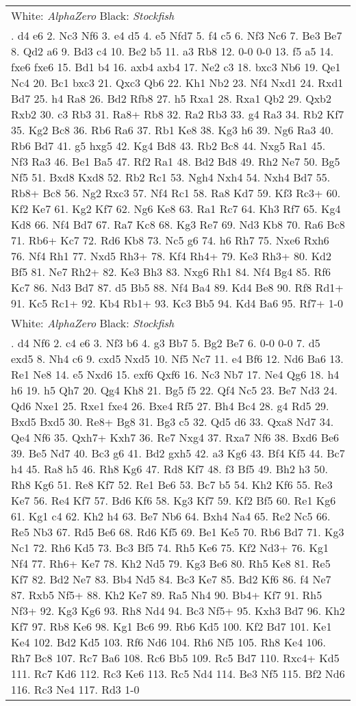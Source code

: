 \documentclass[12pt]{article}
\begin{document}
\begin{small}
\begin{longtable}{p{\textwidth}}
\hline
White: \emph{AlphaZero} Black: \emph{Stockfish} \\\nopagebreak
1. d4 e6 2. Nc3 Nf6 3. e4 d5 4. e5 Nfd7 5. f4 c5 6. Nf3 Nc6 7. Be3 Be7 8. Qd2 a6 9. Bd3 c4 10. Be2 b5 11. a3 Rb8 12. 0-0 0-0 13. f5 a5 14. fxe6 fxe6 15. Bd1 b4 16. axb4 axb4 17. Ne2 c3 18. bxc3 Nb6 19. Qe1 Nc4 20. Bc1 bxc3 21. Qxc3 Qb6 22. Kh1 Nb2 23. Nf4 Nxd1 24. Rxd1 Bd7 25. h4 Ra8 26. Bd2 Rfb8 27. h5 Rxa1 28. Rxa1 Qb2 29. Qxb2 Rxb2 30. c3 Rb3 31. Ra8+ Rb8 32. Ra2 Rb3 33. g4 Ra3 34. Rb2 Kf7 35. Kg2 Bc8 36. Rb6 Ra6 37. Rb1 Ke8 38. Kg3 h6 39. Ng6 Ra3 40. Rb6 Bd7 41. g5 hxg5 42. Kg4 Bd8 43. Rb2 Bc8 44. Nxg5 Ra1 45. Nf3 Ra3 46. Be1 Ba5 47. Rf2 Ra1 48. Bd2 Bd8 49. Rh2 Ne7 50. Bg5 Nf5 51. Bxd8 Kxd8 52. Rb2 Rc1 53. Ngh4 Nxh4 54. Nxh4 Bd7 55. Rb8+ Bc8 56. Ng2 Rxc3 57. Nf4 Rc1 58. Ra8 Kd7 59. Kf3 Rc3+ 60. Kf2 Ke7 61. Kg2 Kf7 62. Ng6 Ke8 63. Ra1 Rc7 64. Kh3 Rf7 65. Kg4 Kd8 66. Nf4 Bd7 67. Ra7 Kc8 68. Kg3 Re7 69. Nd3 Kb8 70. Ra6 Bc8 71. Rb6+ Kc7 72. Rd6 Kb8 73. Nc5 g6 74. h6 Rh7 75. Nxe6 Rxh6 76. Nf4 Rh1 77. Nxd5 Rh3+ 78. Kf4 Rh4+ 79. Ke3 Rh3+ 80. Kd2 Bf5 81. Ne7 Rh2+ 82. Ke3 Bh3 83. Nxg6 Rh1 84. Nf4 Bg4 85. Rf6 Kc7 86. Nd3 Bd7 87. d5 Bb5 88. Nf4 Ba4 89. Kd4 Be8 90. Rf8 Rd1+ 91. Kc5 Rc1+ 92. Kb4 Rb1+ 93. Kc3 Bb5 94. Kd4 Ba6 95. Rf7+ 1-0 \\
\hline
White: \emph{AlphaZero} Black: \emph{Stockfish} \\\nopagebreak
1. d4 Nf6 2. c4 e6 3. Nf3 b6 4. g3 Bb7 5. Bg2 Be7 6. 0-0 0-0 7. d5 exd5 8. Nh4 c6 9. cxd5 Nxd5 10. Nf5 Nc7 11. e4 Bf6 12. Nd6 Ba6 13. Re1 Ne8 14. e5 Nxd6 15. exf6 Qxf6 16. Nc3 Nb7 17. Ne4 Qg6 18. h4 h6 19. h5 Qh7 20. Qg4 Kh8 21. Bg5 f5 22. Qf4 Nc5 23. Be7 Nd3 24. Qd6 Nxe1 25. Rxe1 fxe4 26. Bxe4 Rf5 27. Bh4 Bc4 28. g4 Rd5 29. Bxd5 Bxd5 30. Re8+ Bg8 31. Bg3 c5 32. Qd5 d6 33. Qxa8 Nd7 34. Qe4 Nf6 35. Qxh7+ Kxh7 36. Re7 Nxg4 37. Rxa7 Nf6 38. Bxd6 Be6 39. Be5 Nd7 40. Bc3 g6 41. Bd2 gxh5 42. a3 Kg6 43. Bf4 Kf5 44. Bc7 h4 45. Ra8 h5 46. Rh8 Kg6 47. Rd8 Kf7 48. f3 Bf5 49. Bh2 h3 50. Rh8 Kg6 51. Re8 Kf7 52. Re1 Be6 53. Bc7 b5 54. Kh2 Kf6 55. Re3 Ke7 56. Re4 Kf7 57. Bd6 Kf6 58. Kg3 Kf7 59. Kf2 Bf5 60. Re1 Kg6 61. Kg1 c4 62. Kh2 h4 63. Be7 Nb6 64. Bxh4 Na4 65. Re2 Nc5 66. Re5 Nb3 67. Rd5 Be6 68. Rd6 Kf5 69. Be1 Ke5 70. Rb6 Bd7 71. Kg3 Nc1 72. Rh6 Kd5 73. Bc3 Bf5 74. Rh5 Ke6 75. Kf2 Nd3+ 76. Kg1 Nf4 77. Rh6+ Ke7 78. Kh2 Nd5 79. Kg3 Be6 80. Rh5 Ke8 81. Re5 Kf7 82. Bd2 Ne7 83. Bb4 Nd5 84. Bc3 Ke7 85. Bd2 Kf6 86. f4 Ne7 87. Rxb5 Nf5+ 88. Kh2 Ke7 89. Ra5 Nh4 90. Bb4+ Kf7 91. Rh5 Nf3+ 92. Kg3 Kg6 93. Rh8 Nd4 94. Bc3 Nf5+ 95. Kxh3 Bd7 96. Kh2 Kf7 97. Rb8 Ke6 98. Kg1 Bc6 99. Rb6 Kd5 100. Kf2 Bd7 101. Ke1 Ke4 102. Bd2 Kd5 103. Rf6 Nd6 104. Rh6 Nf5 105. Rh8 Ke4 106. Rh7 Bc8 107. Rc7 Ba6 108. Rc6 Bb5 109. Rc5 Bd7 110. Rxc4+ Kd5 111. Rc7 Kd6 112. Rc3 Ke6 113. Rc5 Nd4 114. Be3 Nf5 115. Bf2 Nd6 116. Rc3 Ne4 117. Rd3 1-0 \\

\end{longtable}
\end{small}
\end{document}
